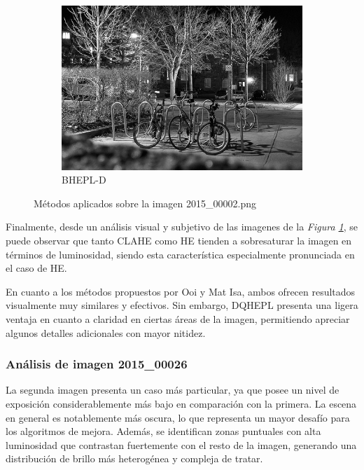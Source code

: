 \documentclass[sigchi]{acmart}
\begin{document}
\begin{figure}[htbp]
	\begin{subfigure}[b]{0.32\textwidth}
		\centering
		\includegraphics[width=\linewidth]{./procesadas/2015_00002/2015_00002_bhepl_d.png}
		\caption{BHEPL-D}
	\end{subfigure}

	\caption{Métodos aplicados sobre la imagen 2015\_00002.png}
	\label{fig:visual_002}
\end{figure}

Finalmente, desde un análisis visual y subjetivo de las imagenes de la \emph{Figura \ref{fig:visual_002}},
se puede observar que tanto CLAHE como HE tienden a sobresaturar la imagen en términos de
luminosidad, siendo esta característica especialmente pronunciada en el caso de HE.

En cuanto a los métodos propuestos por Ooi y Mat Isa, ambos ofrecen resultados visualmente muy
similares y efectivos. Sin embargo, DQHEPL presenta una ligera ventaja en cuanto a claridad en
ciertas áreas de la imagen, permitiendo apreciar algunos detalles adicionales con mayor
nitidez.

\subsubsection{\textbf{Análisis de imagen 2015\_00026}}

La segunda imagen presenta un caso más particular, ya que posee un nivel de exposición
considerablemente más bajo en comparación con la primera. La escena en general es notablemente
más oscura, lo que representa un mayor desafío para los algoritmos de mejora. Además, se
identifican zonas puntuales con alta luminosidad que contrastan fuertemente con el resto de la
imagen, generando una distribución de brillo más heterogénea y compleja de tratar.
\end{document}
